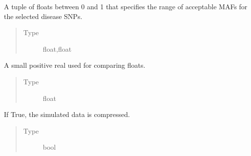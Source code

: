 \documentclass[a4paper,10pt,english]{sphinxhowto}
\begin{document}
\begin{fulllineitems}
\begin{fulllineitems}
\begin{quote}
\begin{description}
\end{description}\end{quote}

\end{fulllineitems}


\begin{fulllineitems}
\label{\detokenize{utils:utils.data_simulator.DataSimulator.disease_maf_range}}
A tuple of floats between 0 and 1 that specifies the range of acceptable MAFs for the selected disease SNPs.
\begin{quote}\begin{description}
\item[{Type}] \leavevmode
float,float

\end{description}\end{quote}

\end{fulllineitems}


\begin{fulllineitems}
\label{\detokenize{utils:utils.data_simulator.DataSimulator.epsilon}}
A small positive real used for comparing floats.
\begin{quote}\begin{description}
\item[{Type}] \leavevmode
float

\end{description}\end{quote}

\end{fulllineitems}


\begin{fulllineitems}
\label{\detokenize{utils:utils.data_simulator.DataSimulator.compress}}
If True, the simulated data is compressed.
\begin{quote}\begin{description}
\item[{Type}] \leavevmode
bool


\end{description}
\end{quote}
\end{fulllineitems}
\end{fulllineitems}
\end{document}
